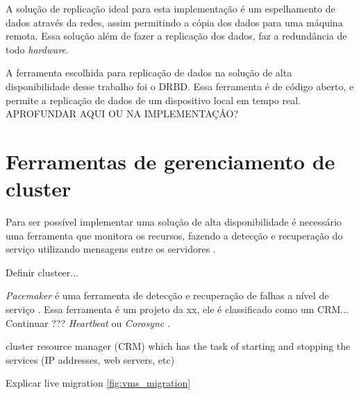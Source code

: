 A solução de replicação ideal para esta implementação é um espelhamento de dados através da redes, assim permitindo a cópia dos dados para uma
máquina remota. Essa solução além de fazer a replicação dos dados, faz a redundância de todo \textit{hardware}.

A ferramenta escolhida para replicação de dados na solução de alta disponibilidade desse trabalho foi o \ac{DRBD}. Essa ferramenta é de código
aberto, e permite a replicação de dados de um dispositivo local em tempo real. 
APROFUNDAR AQUI OU NA IMPLEMENTAÇÂO?


\section{Ferramentas de gerenciamento de cluster}
\label{section:toolcluster}

Para ser possível implementar uma solução de alta disponibilidade é necessário uma ferramenta que monitora os recursos, fazendo a detecção e
recuperação do serviço utilizando mensagens entre os servidores \cite{perkov2011}.

Definir clusteer...

\textit{Pacemaker} é uma ferramenta de detecção e recuperação de falhas a nível de serviço \cite{perkov2011}. Essa ferramenta é um projeto da
xx, ele é classificado como um CRM...
Continuar ??? \textit{Heartbeat} ou \textit{Corosync} \cite{zaminhani2008}.

cluster resource manager (CRM) which has the task of starting and stopping the services (IP addresses, web servers, etc)


Explicar live migration \ref{fig:vms_migration}

